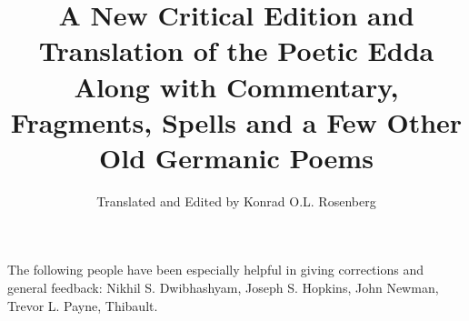 \title{%
  A New Critical Edition and Translation of the Poetic Edda \\
  \large Along with Commentary, Fragments, Spells and a Few Other Old Germanic Poems}

\author{Translated and Edited by Konrad O.L. Rosenberg}

\maketitle

\newpage

\begin{center} The following people have been especially helpful in giving corrections and general feedback: Nikhil S. Dwibhashyam, Joseph S. Hopkins, John Newman, Trevor L. Payne, Thibault.\end{center}

\newpage

\thispagestyle{empty}\tableofcontents

\newpage

